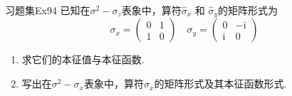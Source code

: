 \begin{question}{习题集Ex94}
    已知在$\sigma^2-\sigma_z$表象中，算符$\hat{\sigma}_x$ 和 $\hat{\sigma}_y$的矩阵形式为
    $$
        \sigma_x=\begin{pmatrix}
            0 & 1 \\
            1 & 0
        \end{pmatrix}
        \quad
        \sigma_y=\begin{pmatrix}
            0          & -\mathrm{i} \\
            \mathrm{i} & 0
        \end{pmatrix}
    $$
    \begin{enumerate}
        \item 求它们的本征值与本征函数.
        \item 写出在$\sigma^2-\sigma_x$表象中，算符$\hat{\sigma}_x$的矩阵形式及其本征函数形式.
    \end{enumerate}
\end{question}
